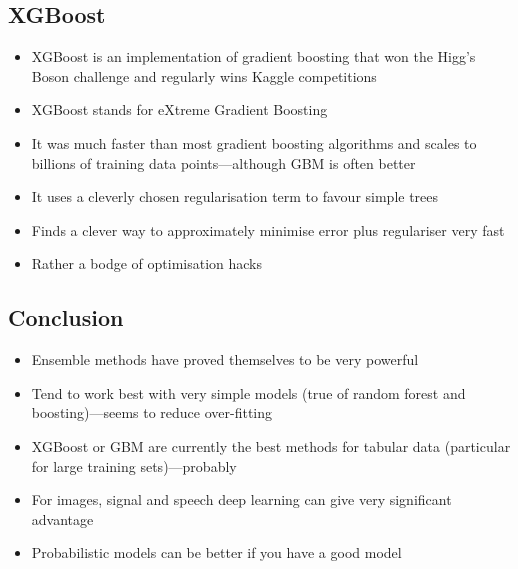 \begin{slide}
\section[-2]{XGBoost}

\begin{PauseHighLight}
  \begin{itemize}
  \item XGBoost is an implementation of gradient boosting that won the
    Higg's Boson challenge and regularly wins Kaggle competitions\pause
  \item XGBoost stands for eXtreme Gradient Boosting\pause
  \item It was much faster than most gradient boosting algorithms and
    scales to billions of training data points---although GBM is often
    better\pause
  \item It uses a cleverly chosen regularisation term to favour simple
    trees\pause
  \item Finds a clever way to approximately minimise error plus
    regulariser very fast\pause
  \item Rather a bodge of optimisation hacks\pauseb
  \end{itemize}
\end{PauseHighLight}


\end{slide}


\begin{slide}
\section{Conclusion}

\begin{PauseHighLight}
  \begin{itemize}
  \item Ensemble methods have proved themselves to be very
    powerful\pause
  \item Tend to work best with very simple models (true of random forest
    and boosting)\pause---seems to reduce over-fitting\pauseb
  \item XGBoost or GBM are currently the best methods for tabular data
    (particular for large training sets)\pause---probably\pauseb
  \item For images, signal and speech deep learning can give very
    significant advantage\pause
  \item Probabilistic models can be better if you have a good model\pause
  \end{itemize}
\end{PauseHighLight}

\end{slide}


